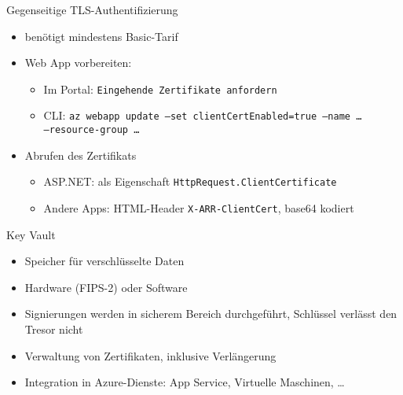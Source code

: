 \begin{flashcard}[Definition]{Gegenseitige TLS-Authentifizierung}
    \begin{itemize}
        \item benötigt mindestens Basic-Tarif
        \item Web App vorbereiten:
            \begin{itemize}
                \item Im Portal:\newline
                    \texttt{Eingehende Zertifikate anfordern}
                \item CLI:\newline
                    \texttt{az webapp update --set clientCertEnabled=true --name \ldots\\--resource-group \ldots}
            \end{itemize}
        \item Abrufen des Zertifikats
            \begin{itemize}
                \item ASP.NET: als Eigenschaft \texttt{HttpRequest.ClientCertificate}
                \item Andere Apps: HTML-Header \texttt{X-ARR-ClientCert}, base64 kodiert
            \end{itemize}
    \end{itemize}
\end{flashcard}


\begin{flashcard}[Definition]{Key Vault}
    \begin{itemize}
        \item Speicher für verschlüsselte Daten
        \item Hardware (FIPS-2) oder Software
        \item Signierungen werden in sicherem Bereich durchgeführt, Schlüssel verlässt den Tresor nicht
        \item Verwaltung von Zertifikaten, inklusive Verlängerung
        \item Integration in Azure-Dienste: App Service, Virtuelle Maschinen, \ldots
    \end{itemize}
\end{flashcard}

